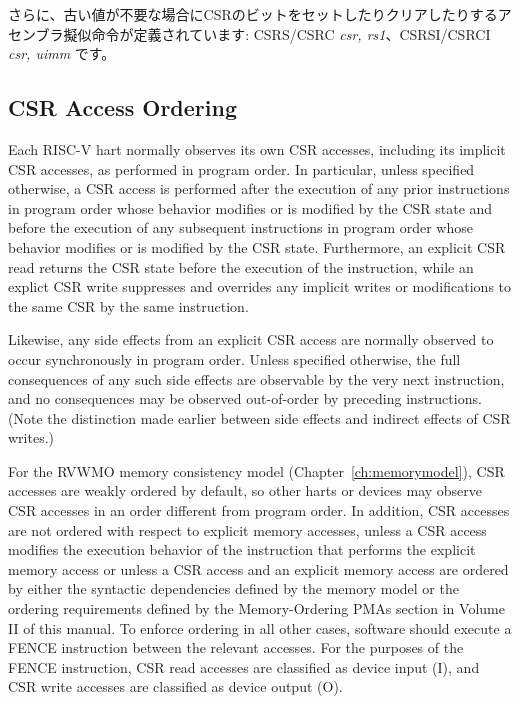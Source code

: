 \begin{comment}
Further assembler pseudoinstructions are defined to set and clear
bits in the CSR when the old value is not required: CSRS/CSRC {\em
  csr, rs1}; CSRSI/CSRCI {\em csr, uimm}.
\end{comment}

さらに、古い値が不要な場合にCSRのビットをセットしたりクリアしたりするアセンブラ擬似命令が定義されています:
CSRS/CSRC {\em csr, rs1}、CSRSI/CSRCI {\em csr, uimm} です。


\subsection*{CSR Access Ordering}

Each RISC-V hart normally observes its own CSR accesses, including its
implicit CSR accesses, as performed in program order.
In particular, unless specified otherwise, a CSR access is performed
after the execution of any prior instructions in program order whose behavior
modifies or is modified by the CSR state and before the execution of any
subsequent instructions in program order whose behavior modifies or is modified
by the CSR state.
Furthermore, an explicit CSR read returns the
CSR state before the execution of the instruction, while an
explict CSR write suppresses and overrides any implicit writes or
modifications to the same CSR by the same instruction.

Likewise, any side effects from an explicit CSR access are normally
observed to occur synchronously in program order.
Unless specified otherwise, the full consequences of any such side
effects are observable by the very next instruction, and no consequences
may be observed out-of-order by preceding instructions.
(Note the distinction made earlier between side effects and indirect
effects of CSR writes.)

For the RVWMO memory consistency model (Chapter~\ref{ch:memorymodel}),
CSR accesses are weakly ordered by default,
so other harts or devices may observe CSR accesses in an order
different from program order. In addition, CSR accesses are not ordered with
respect to explicit memory accesses, unless a CSR access modifies the execution
behavior of the instruction that performs the explicit memory access or unless
a CSR access and an explicit memory access are ordered by either the syntactic
dependencies defined by the memory model or the ordering requirements defined
by the Memory-Ordering PMAs section in Volume II of this manual. To enforce
ordering in all other cases, software should execute a FENCE instruction
between the relevant accesses. For the purposes of the FENCE instruction, CSR
read accesses are classified as device input (I), and CSR write accesses are
classified as device output (O).

